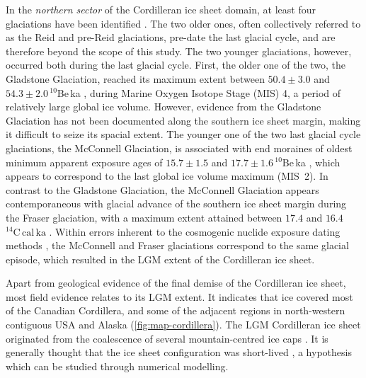 \documentclass[a4paper]{kappa}
\newcommand{\unit}[1]{\ensuremath{\mathrm{#1}}}
\begin{document}
In the \emph{northern sector} of the Cordilleran ice sheet domain, at least
four glaciations have been identified
    \citep{Duk-Rodkin.1999, Ward.etal.2007, Ward.etal.2008,
           Briner.Kaufman.2008, Demuro.etal.2012,
           Stroeven.etal.2010, Stroeven.etal.2014}.
The two older ones, often collectively referred to as the Reid and pre-Reid
glaciations, pre-date the last glacial cycle, and are therefore beyond the
scope of this study. The two younger glaciations, however, occurred both during
the last glacial cycle. First, the older one of the two, the Gladstone
Glaciation,
reached its maximum extent between $50.4\pm3.0$ and $54.3\pm2.0\,^{10}$Be\,ka
\citep{Ward.etal.2007}, during Marine Oxygen Isotope Stage (MIS) 4, a period of
relatively large global ice volume. However, evidence from the Gladstone
Glaciation has not been documented along the southern ice sheet margin, making
it difficult to seize its spacial extent. The younger one of the two last
glacial
cycle glaciations, the McConnell Glaciation, is associated with end moraines of
oldest minimum apparent exposure ages of $15.7\pm1.5$ and
$17.7\pm1.6\,^{10}$Be\,ka \citep{Stroeven.etal.2014}, which appears to
correspond to the last global ice volume maximum (MIS~2). In contrast to the
Gladstone Glaciation, the McConnell Glaciation appears contemporaneous with
glacial advance of the southern ice sheet margin during the Fraser glaciation,
with a maximum extent attained between $17.4$ and
$16.4$\,\unit{^{14}C\,cal\,ka} \citep{Porter.Swanson.1998}. Within errors
inherent to the cosmogenic nuclide exposure dating methods
\citep{Heyman.etal.2011}, the McConnell and Fraser glaciations correspond to
the same glacial episode, which resulted in the LGM extent of the Cordilleran
ice sheet.

Apart from geological evidence of the final demise of the Cordilleran ice sheet, most field
evidence relates to its LGM extent. It indicates that ice covered most of the
Canadian Cordillera, and some of the adjacent regions in north-western
contiguous USA and Alaska (\cref{fig:map-cordillera}). The LGM Cordilleran ice
sheet originated from the coalescence of several mountain-centred ice caps
\citep{Davis.Mathews.1944}. It is generally thought that the ice sheet
configuration
was short-lived \citep{Clague.etal.1980, Clague.1985, Cosma.etal.2008}, a
hypothesis which can be studied through numerical modelling.
\end{document}
